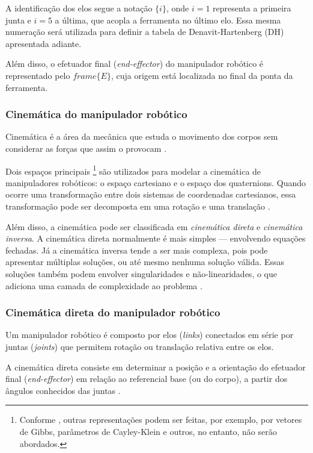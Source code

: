 A identificação dos elos segue a notação $\{i\}$, onde $i=1$ representa a primeira junta e $i=5$ a última, que acopla a ferramenta no último elo. Essa mesma numeração será utilizada para definir a tabela de Denavit-Hartenberg (DH) apresentada adiante.

Além disso, o efetuador final (\emph{end-effector}) do manipulador robótico é representado pelo $frame \{E\}$, cuja origem está localizada no final da ponta da ferramenta.

\subsubsection{Cinemática do manipulador robótico}
Cinemática é a área da mecânica que estuda o movimento dos corpos sem considerar as forças que assim o provocam \cite{craig2005}.  

Dois espaços principais
\footnote{Conforme \cite{kucuk2006robot}, outras representações podem ser feitas, por exemplo, por vetores de Gibbs, parâmetros de Cayley-Klein e outros, no entanto, não serão abordados.}
são utilizados para modelar a cinemática de manipuladores robóticos: o espaço cartesiano e o espaço dos quaternions. Quando ocorre uma transformação entre dois sistemas de coordenadas cartesianos, essa transformação pode ser decomposta em uma rotação e uma translação \cite{kucuk2006robot}.  

Além disso, a cinemática pode ser classificada em \emph{cinemática direta} e \emph{cinemática inversa}. A cinemática direta normalmente é mais simples — envolvendo equações fechadas. Já a cinemática inversa tende a ser mais complexa, pois pode apresentar múltiplas soluções, ou até mesmo nenhuma solução válida. Essas soluções também podem envolver singularidades e não-linearidades, o que adiciona uma camada de complexidade ao problema \cite{craig2005, kucuk2006robot}.

\subsubsection{Cinemática direta do manipulador robótico}
Um manipulador robótico é composto por elos (\emph{links}) conectados em série por juntas (\emph{joints}) que permitem rotação ou translação relativa entre os elos.  

A cinemática direta consiste em determinar a posição e a orientação do efetuador final (\emph{end-effector}) em relação ao referencial base (ou do corpo), a partir dos ângulos conhecidos das juntas \cite{kucuk2006robot}.

